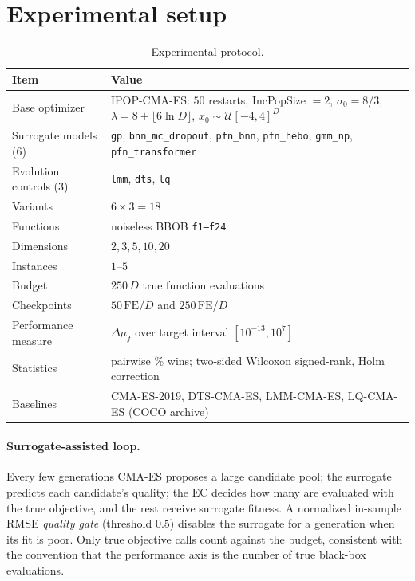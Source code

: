 \documentclass[11pt,a4paper]{article}
\newcommand{\dmf}{\Delta\mu_f}
\newcommand{\fed}{\text{FE}/D}
\begin{document}
\section{Experimental setup}
\label{sec:setup}

\begin{table}[H]
\centering
\caption{Experimental protocol.}
\begin{tabular}{@{}p{4.4cm}p{10.2cm}@{}}
\toprule
\textbf{Item} & \textbf{Value} \\
\midrule
Base optimizer & IPOP-CMA-ES: $50$ restarts, IncPopSize $=2$, $\sigma_0=8/3$,
$\lambda=8+\lfloor 6\ln D\rfloor$, $x_0\sim\mathcal{U}[-4,4]^D$ \\
Surrogate models (6) & \texttt{gp}, \texttt{bnn\_mc\_dropout}, \texttt{pfn\_bnn},
\texttt{pfn\_hebo}, \texttt{gmm\_np}, \texttt{pfn\_transformer} \\
Evolution controls (3) & \texttt{lmm}, \texttt{dts}, \texttt{lq} \cite{pitra2021} \\
Variants & $6\times3=18$ \\
Functions & noiseless BBOB \texttt{f1--f24} \\
Dimensions & $2,3,5,10,20$ \\
Instances & $1$--$5$ \\
Budget & $250\,D$ true function evaluations \\
Checkpoints & $50\,\fed$ and $250\,\fed$ \\
Performance measure & $\dmf$ over target interval $[10^{-13},10^{7}]$ \\
Statistics & pairwise \% wins; two-sided Wilcoxon signed-rank, Holm correction \\
Baselines & CMA-ES-2019, DTS-CMA-ES, LMM-CMA-ES, LQ-CMA-ES (COCO archive) \\
\bottomrule
\end{tabular}
\end{table}

\paragraph{Surrogate-assisted loop.}
Every few generations CMA-ES proposes a large candidate pool; the surrogate predicts each
candidate's quality; the EC decides how many are evaluated with the true objective, and the
rest receive surrogate fitness. A normalized in-sample RMSE \emph{quality gate} (threshold
$0.5$) disables the surrogate for a generation when its fit is poor. Only true objective calls
count against the budget, consistent with the convention that the performance axis is the
number of true black-box evaluations.
\end{document}
